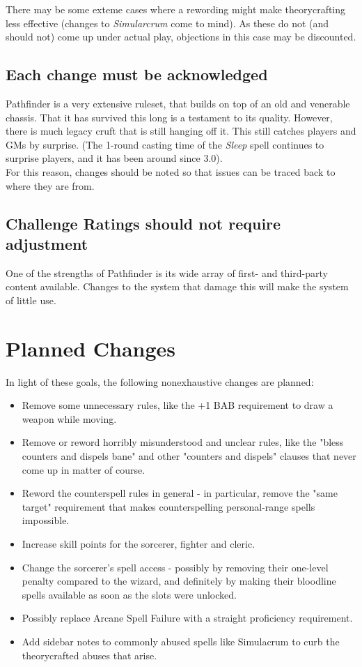 There may be some exteme cases where a rewording might make theorycrafting less effective (changes to 
\textit{Simularcrum} come to mind). As these do not (and should not) come up under actual play,
objections in this case may be discounted. \\

\subsection{Each change must be acknowledged}

Pathfinder is a very extensive ruleset, that builds on top of an old and venerable chassis. That it
has survived this long is a testament to its quality. However, there is much legacy cruft that is still
hanging off it. This still catches players and GMs by surprise. (The 1-round casting time of the \textit{Sleep}
spell continues to surprise players, and it has been around since 3.0). \\

For this reason, changes should be noted so that issues can be traced back to where they are from. \\

\subsection{Challenge Ratings should not require adjustment}

One of the strengths of Pathfinder is its wide array of first- and third-party content available. Changes to
the system that damage this will make the system of little use.


\section{Planned Changes}
In light of these goals, the following nonexhaustive changes are planned:

\begin{itemize}
 \item Remove some unnecessary rules, like the +1 BAB requirement to draw a weapon while moving.
 \item Remove or reword horribly misunderstood and unclear rules, like the "bless counters and dispels bane" and other "counters and dispels" clauses that never come up in matter of course.
 \item Reword the counterspell rules in general - in particular, remove the "same target" requirement that makes counterspelling personal-range spells impossible.
 \item Increase skill points for the sorcerer, fighter and cleric.
 \item Change the sorcerer's spell access - possibly by removing their one-level penalty compared to the wizard, and definitely by making their bloodline spells available as soon as the slots were unlocked.
 \item Possibly replace Arcane Spell Failure with a straight proficiency requirement.
 \item Add sidebar notes to commonly abused spells like Simulacrum to curb the theorycrafted abuses that arise. 
\end{itemize}

